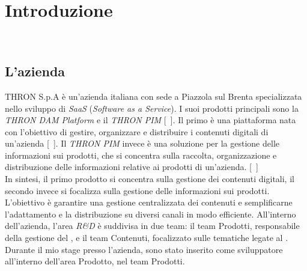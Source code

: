 \chapter{Introduzione}\label{cap:introduzione}

\\

\section{L'azienda}\label{sec:azienda}
THRON S.p.A è un'azienda italiana con sede a Piazzola sul Brenta specializzata nello sviluppo di \textit{SaaS} (\textit{Software as a Service}).
I suoi prodotti principali sono la \textit{THRON DAM Platform} e il \textit{THRON PIM} [~\cite{site:thron}]. 
Il primo è una piattaforma nata con l'obiettivo di gestire, organizzare e distribuire i contenuti digitali di un'azienda [~\cite{site:dam}].
Il \textit{THRON PIM} invece è una soluzione per la gestione delle informazioni sui prodotti, che si concentra
sulla raccolta, organizzazione e distribuzione delle informazioni relative ai prodotti di un'azienda. [~\cite{site:pim}]\\
In sintesi, il primo prodotto si concentra sulla gestione dei contenuti digitali, il secondo invece
si focalizza sulla gestione delle informazioni sui prodotti.
L'obiettivo è garantire una gestione centralizzata dei contenuti e semplificarne l'adattamento e la distribuzione su diversi
canali in modo efficiente.
All'interno dell'azienda, l'area \textit{R\&D} è suddivisa in due team: il team Prodotti, responsabile della gestione
del , e il team Contenuti, focalizzato sulle tematiche legate al .\\
Durante il mio stage presso l'azienda, sono stato inserito come sviluppatore  all'interno dell'area Prodotto, nel team Prodotti.


